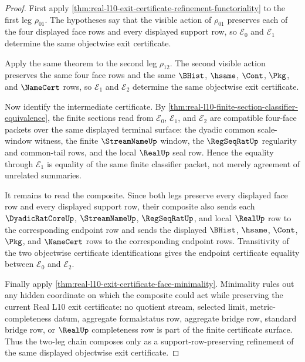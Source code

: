 \begin{proof}
First apply \autoref{thm:real-l10-exit-certificate-refinement-functoriality} to the first leg $\rho_{01}$. The hypotheses say that the visible action of $\rho_{01}$ preserves each of the four displayed face rows and every displayed support row, so $\mathcal E_0$ and $\mathcal E_1$ determine the same objectwise exit certificate.

Apply the same theorem to the second leg $\rho_{12}$. The second visible action preserves the same four face rows and the same $\BHist$, $\hsame$, $\Cont$, $\Pkg$, and $\NameCert$ rows, so $\mathcal E_1$ and $\mathcal E_2$ determine the same objectwise exit certificate.

Now identify the intermediate certificate. By \autoref{thm:real-l10-finite-section-classifier-equivalence}, the finite sections read from $\mathcal E_0$, $\mathcal E_1$, and $\mathcal E_2$ are compatible four-face packets over the same displayed terminal surface: the dyadic common scale-window witness, the finite $\StreamNameUp$ window, the $\RegSeqRatUp$ regularity and common-tail rows, and the local $\RealUp$ seal row. Hence the equality through $\mathcal E_1$ is equality of the same finite classifier packet, not merely agreement of unrelated summaries.

It remains to read the composite. Since both legs preserve every displayed face row and every displayed support row, their composite also sends each $\DyadicRatCoreUp$, $\StreamNameUp$, $\RegSeqRatUp$, and local $\RealUp$ row to the corresponding endpoint row and sends the displayed $\BHist$, $\hsame$, $\Cont$, $\Pkg$, and $\NameCert$ rows to the corresponding endpoint rows. Transitivity of the two objectwise certificate identifications gives the endpoint certificate equality between $\mathcal E_0$ and $\mathcal E_2$.

Finally apply \autoref{thm:real-l10-exit-certificate-face-minimality}. Minimality rules out any hidden coordinate on which the composite could act while preserving the current Real L10 exit certificate: no quotient stream, selected limit, metric-completeness datum, aggregate formalstatus row, aggregate bridge row, standard bridge row, or $\RealUp$ completeness row is part of the finite certificate surface. Thus the two-leg chain composes only as a support-row-preserving refinement of the same displayed objectwise exit certificate.
\end{proof}

